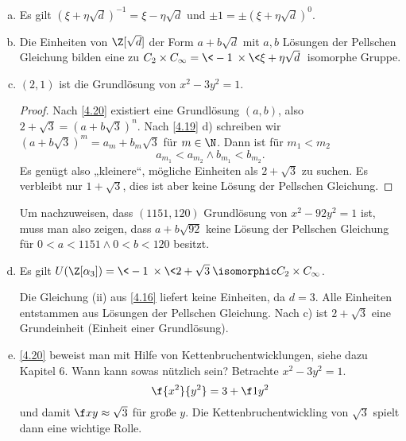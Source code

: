 \begin{nt} \label{4.22}
	\begin{enumerate}[a)]
		\item
			Es gilt $(\xi + \eta \sqrt d)^{-1} = \xi - \eta \sqrt d$ und $\pm 1 = \pm (\xi + \eta \sqrt d)^0$.
		\item
			Die Einheiten von $\Z[\sqrt d]$ der Form $a + b \sqrt d$ mit $a, b$ Lösungen der Pellschen Gleichung bilden eine zu $C_2 \times C_\infty = \<-1\> \times \<\xi + \eta \sqrt d\>$ isomorphe Gruppe.
		\item
			$(2,1)$ ist die Grundlösung von $x^2 - 3y^2 = 1$.
			\begin{proof}
				Nach \ref{4.20} existiert eine Grundlösung $(a,b)$, also $2 + \sqrt 3 = (a + b\sqrt 3)^n$.
				Nach \ref{4.19} d) schreiben wir $(a + b \sqrt 3)^m = a_m + b_m \sqrt 3$ für $m \in \N$.
				Dann ist für $m_1 < m_2$
				\[
					a_{m_1} < a_{m_2} \land b_{m_1} < b_{m_2}.
				\]
				Es genügt also „kleinere“, mögliche Einheiten als $2 + \sqrt 3$ zu suchen.
				Es verbleibt nur $1 + \sqrt 3$, dies ist aber keine Lösung der Pellschen Gleichung.
			\end{proof}
			Um nachzuweisen, dass $(1151, 120)$ Grundlösung von $x^2 - 92y^2 = 1$ ist, muss man also zeigen, dass $a + b\sqrt{92}$ keine Lösung der Pellschen Gleichung für $0 < a < 1151 \land 0 < b < 120$ besitzt.
		\item
			Es gilt $U(\Z[\alpha_3]) = \<-1\> \times \<2 + \sqrt 3\> \isomorphic C_2 \times C_\infty$.

			Die Gleichung (ii) aus \ref{4.16} liefert keine Einheiten, da $d = 3$.
			Alle Einheiten entstammen aus Lösungen der Pellschen Gleichung.
			Nach c) ist $2 + \sqrt 3$ eine Grundeinheit (Einheit einer Grundlösung).
		\item
			\ref{4.20} beweist man mit Hilfe von Kettenbruchentwicklungen, siehe dazu Kapitel 6. %
			Wann kann sowas nützlich sein?
			Betrachte $x^2 - 3y^2 = 1$.
			\[
				\f{x^2}{y^2} = 3 + \f 1{y^2}
			\]
			und damit $\f xy \approx \sqrt 3$ für große $y$.
			Die Kettenbruchentwickling von $\sqrt 3$ spielt dann eine wichtige Rolle.
	\end{enumerate}
\end{nt}

